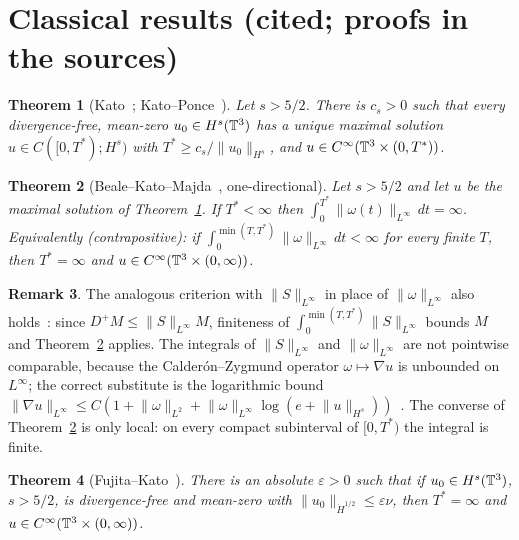 \documentclass[11pt,reqno]{amsart}
\newtheorem{theorem}{Theorem}[section]
\theoremstyle{definition}
\newtheorem{remark}[theorem]{Remark}
\newcommand{\norm}[1]{\lVert #1\rVert}
\begin{document}
\section{Classical results (cited; proofs in the sources)}
\begin{theorem}[Kato~\cite{Kato1972}; Kato--Ponce~\cite{KatoPonce1988}]\label{thm:B}
Let $s>5/2$. There is $c_s>0$ such that every divergence-free, mean-zero $u_0\in H^s(\mathbb{T}^3)$ has a unique maximal solution $u\in C([0,T^*);H^s)$ with $T^*\ge c_s/\norm{u_0}_{H^s}$, and $u\in C^\infty(\mathbb{T}^3\times(0,T^*))$.
\end{theorem}
\begin{theorem}[Beale--Kato--Majda~\cite{BKM1984}, one-directional]\label{thm:A}
Let $s>5/2$ and let $u$ be the maximal solution of Theorem~\ref{thm:B}. If $T^*<\infty$ then $\int_0^{T^*}\norm{\omega(t)}_{L^\infty}\,dt=\infty$. Equivalently (contrapositive): if $\int_0^{\min(T,T^*)}\norm{\omega}_{L^\infty}\,dt<\infty$ for every finite $T$, then $T^*=\infty$ and $u\in C^\infty(\mathbb{T}^3\times(0,\infty))$.
\end{theorem}
\begin{remark}
The analogous criterion with $\norm{S}_{L^\infty}$ in place of $\norm{\omega}_{L^\infty}$ also holds~\cite{Ponce1985}: since $D^+M\le\norm{S}_{L^\infty}M$, finiteness of $\int_0^{\min(T,T^*)}\norm{S}_{L^\infty}$ bounds $M$ and Theorem~\ref{thm:A} applies. The integrals of $\norm{S}_{L^\infty}$ and $\norm{\omega}_{L^\infty}$ are not pointwise comparable, because the Calder\'on--Zygmund operator $\omega\mapsto\nabla u$ is unbounded on $L^\infty$; the correct substitute is the logarithmic bound $\norm{\nabla u}_{L^\infty}\le C(1+\norm{\omega}_{L^2}+\norm{\omega}_{L^\infty}\log(e+\norm{u}_{H^s}))$~\cite{BKM1984,KozonoTaniuchi2000}. The converse of Theorem~\ref{thm:A} is only local: on every compact subinterval of $[0,T^*)$ the integral is finite.
\end{remark}
\begin{theorem}[Fujita--Kato~\cite{FujitaKato1964}]\label{thm:C}
There is an absolute $\varepsilon>0$ such that if $u_0\in H^s(\mathbb{T}^3)$, $s>5/2$, is divergence-free and mean-zero with $\norm{u_0}_{\dot H^{1/2}}\le\varepsilon\nu$, then $T^*=\infty$ and $u\in C^\infty(\mathbb{T}^3\times(0,\infty))$.
\end{theorem}
\end{document}
